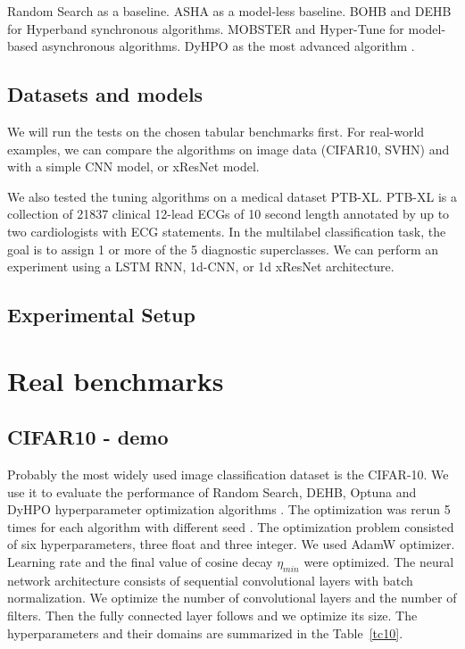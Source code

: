 Random Search as a baseline. ASHA as a model-less baseline. BOHB and DEHB for Hyperband synchronous algorithms. MOBSTER and Hyper-Tune for model-based asynchronous algorithms. DyHPO as the most advanced algorithm .

\subsection{Datasets and models}
We will run the tests on the chosen tabular benchmarks first. For real-world examples, we can compare the algorithms on image data (CIFAR10, SVHN) and with a simple CNN model, or xResNet model.

We also tested the tuning algorithms on a medical dataset PTB-XL. PTB-XL is a collection of 21837 clinical 12-lead ECGs of 10 second length annotated by up to two cardiologists with ECG statements. In the multilabel classification task, the goal is to assign 1 or more of the 5 diagnostic superclasses. We can perform an experiment using a LSTM RNN, 1d-CNN, or 1d xResNet architecture.


\subsection{Experimental Setup}


\section{Real benchmarks}
\subsection{CIFAR10 - demo}

Probably the most widely used image classification dataset is the CIFAR-10. We use it to evaluate the performance of Random Search, DEHB, Optuna and DyHPO hyperparameter optimization algorithms . The optimization was rerun 5 times for each algorithm with different seed . The optimization problem consisted of six hyperparameters, three float and three integer. We used AdamW optimizer. Learning rate and the final value of cosine decay $\eta_{min}$ were optimized. The neural network architecture consists of sequential convolutional layers with batch normalization. We optimize the number of convolutional layers and the number of filters. Then the fully connected layer follows and we optimize its size. The hyperparameters and their domains are summarized in the Table~\ref{tc10}.

